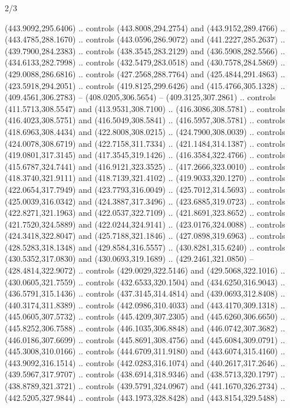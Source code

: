 \begin{flagdescription}{2/3}
\begin{scope}[xshift=0.5\flaglength,yshift=0.5\flagwidth,scale=\flagwidth/495.65]
\begin{scope}[y=0.8pt, x=0.8pt, yscale=-1,shift={(-463.76,-309.78)}]
  (443.9092,295.6406) .. controls (443.8008,294.2754) and (443.9152,289.4766) ..
  (443.4785,288.1670) .. controls (443.0596,286.9072) and (441.2227,285.2637) ..
  (439.7900,284.2383) .. controls (438.3545,283.2129) and (436.5908,282.5566) ..
  (434.6133,282.7998) .. controls (432.5479,283.0518) and (430.7578,284.5869) ..
  (429.0088,286.6816) .. controls (427.2568,288.7764) and (425.4844,291.4863) ..
  (423.5918,294.2051) .. controls (419.8125,299.6426) and (415.4766,305.1328) ..
  (409.4561,306.2783) -- (408.0205,306.5654) -- (409.3125,307.2861) .. controls
  (411.5713,308.5547) and (413.9531,308.7100) .. (416.3086,308.5781) .. controls
  (416.4023,308.5751) and (416.5049,308.5841) .. (416.5957,308.5781) .. controls
  (418.6963,308.4434) and (422.8008,308.0215) .. (424.7900,308.0039) .. controls
  (424.0078,308.6719) and (422.7158,311.7334) .. (421.1484,314.1387) .. controls
  (419.0801,317.3145) and (417.3545,319.1426) .. (416.3584,322.4766) .. controls
  (415.6787,324.7441) and (416.9121,323.3525) .. (417.2666,323.0010) .. controls
  (418.3740,321.9111) and (418.7139,321.4102) .. (419.9033,320.1270) .. controls
  (422.0654,317.7949) and (423.7793,316.0049) .. (425.7012,314.5693) .. controls
  (425.0039,316.0342) and (424.3887,317.3496) .. (423.6885,319.0723) .. controls
  (422.8271,321.1963) and (422.0537,322.7109) .. (421.8691,323.8652) .. controls
  (421.7520,324.5889) and (422.0244,324.9141) .. (423.0176,324.0088) .. controls
  (424.3418,322.8047) and (425.7188,321.1846) .. (427.0898,319.6963) .. controls
  (428.5283,318.1348) and (429.8584,316.5557) .. (430.8281,315.6240) .. controls
  (430.5352,317.0830) and (430.0693,319.1689) .. (429.2461,321.0850) --
  (428.4814,322.9072) .. controls (429.0029,322.5146) and (429.5068,322.1016) ..
  (430.0605,321.7559) .. controls (432.6533,320.1504) and (434.6250,316.9043) ..
  (436.5791,315.1436) .. controls (437.3145,314.4814) and (439.0693,312.8408) ..
  (440.3174,311.8389) .. controls (442.0986,310.4033) and (443.4170,309.1318) ..
  (445.0605,307.5732) .. controls (445.4209,307.2305) and (445.6260,306.6650) ..
  (445.8252,306.7588) .. controls (446.1035,306.8848) and (446.0742,307.3682) ..
  (446.0186,307.6699) .. controls (445.8691,308.4756) and (445.6084,309.0791) ..
  (445.3008,310.0166) .. controls (444.6709,311.9180) and (443.6074,315.4160) ..
  (443.9092,316.1514) .. controls (442.0283,316.1074) and (440.2617,317.2646) ..
  (439.5967,317.9707) .. controls (438.6914,318.9346) and (438.5713,320.1797) ..
  (438.8789,321.3721) .. controls (439.5791,324.0967) and (441.1670,326.2734) ..
  (442.5205,327.9844) .. controls (443.1973,328.8428) and (443.8154,329.5488) ..

\end{scope}
\end{scope}
\end{flagdescription}
